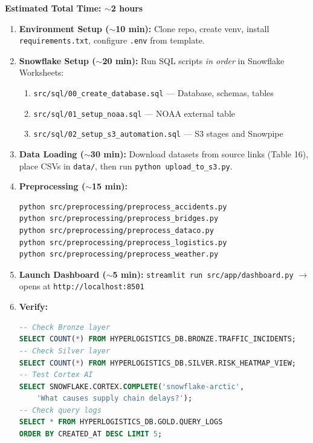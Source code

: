 \documentclass[14.5pt,letterpaper]{article}
\begin{document}
\textbf{Estimated Total Time: $\sim$2 hours}

\begin{enumerate}
    \item \textbf{Environment Setup ($\sim$10 min):} Clone repo, create venv, install \texttt{requirements.txt}, configure \texttt{.env} from template.

    \item \textbf{Snowflake Setup ($\sim$20 min):} Run SQL scripts \textit{in order} in Snowflake Worksheets:
    \begin{enumerate}[label=\alph*.]
        \item \texttt{src/sql/00\_create\_database.sql} --- Database, schemas, tables
        \item \texttt{src/sql/01\_setup\_noaa.sql} --- NOAA external table
        \item \texttt{src/sql/02\_setup\_s3\_automation.sql} --- S3 stages and Snowpipe
    \end{enumerate}

    \item \textbf{Data Loading ($\sim$30 min):} Download datasets from source links (Table 16), place CSVs in \texttt{data/}, then run \texttt{python upload\_to\_s3.py}.

    \item \textbf{Preprocessing ($\sim$15 min):}
\begin{lstlisting}
python src/preprocessing/preprocess_accidents.py
python src/preprocessing/preprocess_bridges.py
python src/preprocessing/preprocess_dataco.py
python src/preprocessing/preprocess_logistics.py
python src/preprocessing/preprocess_weather.py
\end{lstlisting}

    \item \textbf{Launch Dashboard ($\sim$5 min):} \texttt{streamlit run src/app/dashboard.py} $\rightarrow$ opens at \texttt{http://localhost:8501}

    \item \textbf{Verify:}
\begin{lstlisting}[language=SQL]
-- Check Bronze layer
SELECT COUNT(*) FROM HYPERLOGISTICS_DB.BRONZE.TRAFFIC_INCIDENTS;
-- Check Silver layer
SELECT COUNT(*) FROM HYPERLOGISTICS_DB.SILVER.RISK_HEATMAP_VIEW;
-- Test Cortex AI
SELECT SNOWFLAKE.CORTEX.COMPLETE('snowflake-arctic',
    'What causes supply chain delays?');
-- Check query logs
SELECT * FROM HYPERLOGISTICS_DB.GOLD.QUERY_LOGS
ORDER BY CREATED_AT DESC LIMIT 5;
\end{lstlisting}
\end{enumerate}
\end{document}
